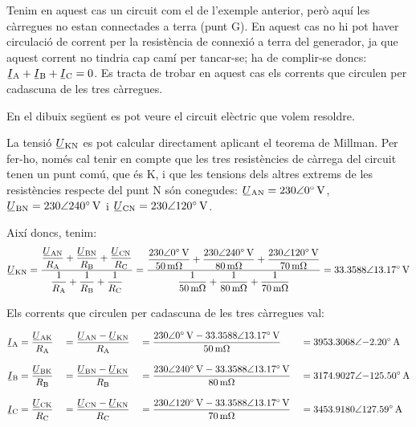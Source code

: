 	
\begin{exemple}[\MillmanTrifNoNeutre{}]
	\addcontentsxms{\MillmanTrifNoNeutre}	
    Tenim en aquest cas un circuit com el de l'exemple anterior, però aquí les càrregues no estan connectades a terra (punt G). En aquest cas no hi pot haver circulació de corrent per la resistència de connexió a terra del generador, ja que aquest corrent no tindria cap camí per tancar-se; ha de complir-se doncs: $\cmplx{I}\ped{A} + \cmplx{I}\ped{B} + \cmplx{I}\ped{C} = 0$. Es tracta de trobar en aquest cas els corrents que circulen per cadascuna de les tres càrregues.

    En el dibuix  següent es pot veure el circuit elèctric que  volem resoldre.

	\begin{center}
		
	\end{center}
   
    La tensió $\cmplx{U}\ped{KN}$ es pot calcular directament aplicant el teorema de Millman. Per fer-ho, només cal tenir en compte que les tres resistències de càrrega del circuit tenen un punt comú, que és K, i que les tensions dels altres extrems de les resistències respecte del punt N són conegudes: $\cmplx{U}\ped{AN}=\complexqty{230:0}{V}$, $\cmplx{U}\ped{BN}=\complexqty{230:240}{V}$ i $\cmplx{U}\ped{CN}=\complexqty{230:120}{V}$.

    Així doncs, tenim:
    \[
    \cmplx{U}\ped{KN} = \frac{ \dfrac{\cmplx{U}\ped{AN}}{R\ped{A}} + \dfrac{\cmplx{U}\ped{BN}}{R\ped{B}} + \dfrac{\cmplx{U}\ped{CN}}{R\ped{C}}} { \dfrac{1}{R\ped{A}} + \dfrac{1}{R\ped{B}} + \dfrac{1}{R\ped{C}}} =
    \frac{\dfrac{\complexqty{230:0}{V}}{\qty{50}{m\ohm}}+\dfrac{\complexqty{230:240}{V}}{\qty{80}{m\ohm}}+
    \dfrac{\complexqty{230:120}{V}}{\qty{70}{m\ohm}}}{\dfrac{1}{\qty{50}{m\ohm}}+\dfrac{1}{\qty{80}{m\ohm}}+
    \dfrac{1}{\qty{70}{m\ohm}}} =
    \complexqty{33,3588:13,17}{V}
    \]



    Els corrents que circulen per cadascuna de les tres càrregues val:
    
    \begin{alignat*}{4}
    \cmplx{I}\ped{A} &= \frac{\cmplx{U}\ped{AK}}{R\ped{A}} &&= \frac{\cmplx{U}\ped{AN} - \cmplx{U}\ped{KN}}{R\ped{A}} &&= \frac{\complexqty{230:0}{V}-\complexqty{33,3588:13,17}{V}}{\qty{50}{m\ohm}}
    &&= \complexqty{3953,3068:-2,20}{A}\\[2ex]
    \cmplx{I}\ped{B} &= \frac{\cmplx{U}\ped{BK}}{R\ped{B}} &&= \frac{\cmplx{U}\ped{BN} - \cmplx{U}\ped{KN}}{R\ped{B}} &&= \frac{\complexqty{230:240}{V}-\complexqty{33,3588:13,17}{V}}{\qty{80}{m\ohm}}
    &&= \complexqty{3174,9027:-125,50}{A}\\[2ex]
    \cmplx{I}\ped{C} &= \frac{\cmplx{U}\ped{CK}}{R\ped{C}} &&= \frac{\cmplx{U}\ped{CN} - \cmplx{U}\ped{KN}}{R\ped{C}} &&= \frac{\complexqty{230:120}{V}-\complexqty{33,3588:13,17}{V}}{\qty{70}{m\ohm}}
    &&= \complexqty{3453,9180:127,59}{A}
    \end{alignat*}
\end{exemple}


